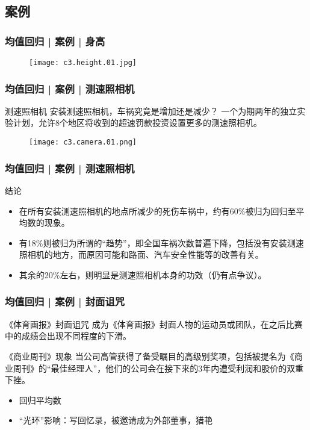 \subsection{案例}
\begin{frame}
  \frametitle{均值回归 | 案例 | 身高}
  \begin{figure}
    \centering
    \texttt{[image: c3.height.01.jpg]}
  \end{figure}
\end{frame}

\begin{frame}
  \frametitle{均值回归 | 案例 | 测速照相机}
  \begin{block}{测速照相机}
    安装测速照相机，车祸究竟是增加还是减少？
    一个为期两年的独立实验计划，允许8个地区将收到的超速罚款投资设置更多的测速照相机。
  \end{block}
  \begin{figure}
    \centering
    \texttt{[image: c3.camera.01.png]}
  \end{figure}
\end{frame}

\begin{frame}
  \frametitle{均值回归 | 案例 | 测速照相机}
  \begin{block}{结论}
    \begin{itemize}
      \item 在所有安装测速照相机的地点所减少的死伤车祸中，约有60\%被归为回归至平均数的现象。
      \item 有18\%则被归为所谓的“趋势”，即全国车祸次数普遍下降，包括没有安装测速照相机的地方，而原因可能和路面、汽车安全性能等的改善有关。
      \item 其余的20\%左右，则明显是测速照相机本身的功效（仍有点争议）。
    \end{itemize}
  \end{block}
\end{frame}

\begin{frame}
  \frametitle{均值回归 | 案例 | 封面诅咒}
  \begin{block}{《体育画报》封面诅咒}
    成为《体育画报》封面人物的运动员或团队，在之后比赛中的成绩会出现不同程度的下滑。
  \end{block}
  \pause
  \begin{block}{《商业周刊》现象}
    当公司高管获得了备受瞩目的高级别奖项，包括被提名为《商业周刊》的“最佳经理人”，他们的公司会在接下来的3年内遭受利润和股价的双重下挫。
    \begin{itemize}
      \item 回归平均数
      \item “光环”影响：写回忆录，被邀请成为外部董事，猎艳
    \end{itemize}
  \end{block}
\end{frame}


